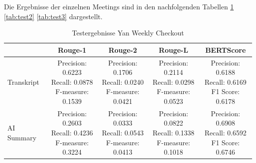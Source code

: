 Die Ergebnisse der einzelnen Meetings sind in den nachfolgenden Tabellen \ref{tab:test1} \ref{tab:test2} \ref{tab:test3} dargestellt.

\begin{table}[H]
    \centering
    \begin{tabular}{|p{2cm}|c|c|c|c|}
    \hline
    & \textbf{Rouge-1} & \textbf{Rouge-2} & \textbf{Rouge-L} &\textbf{BERTScore}\\ \hline
    \hline
    Transkript & \makecell[l]{Precision: 0.6223\\ Recall: 0.0878\\ F-measure: 0.1539} & \makecell[l]{Precision: 0.1706\\ Recall: 0.0240\\ F-measure: 0.0421} & \makecell[l]{Precision: 0.2114\\ Recall: 0.0298\\ F-measure: 0.0523} &\makecell[l]{Precision: 0.6188\\ Recall: 0.6169\\ F1 Score: 0.6178} \\
    \hline
    AI Summary & \makecell[l]{Precision: 0.2603\\ Recall: 0.4236\\ F-measure: 0.3224} & \makecell[l]{Precision: 0.0333\\ Recall: 0.0543\\ F-measure: 0.0413} & \makecell[l]{Precision: 0.0822\\ Recall: 0.1338\\ F-measure: 0.1018} &\makecell[l]{Precision: 0.6908\\ Recall: 0.6592\\ F1 Score: 0.6746} \\
    \hline
    \end{tabular}
    \caption{Testergebnisse Yan Weekly Checkout}
    \label{tab:test1}
\end{table}

